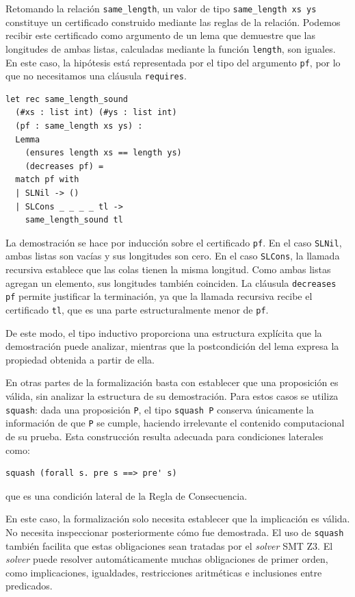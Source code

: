 \documentclass[a4paper,	11pt]{report}
\begin{document}
Retomando la relación \lstinline|same_length|,
un valor de tipo \lstinline|same_length xs ys| constituye un certificado construido mediante las reglas de la relación.
Podemos recibir este certificado como argumento de un lema que demuestre que las longitudes de ambas listas,
calculadas mediante la función \lstinline|length|,
son iguales.
En este caso,
la hipótesis está representada por el tipo del argumento \lstinline|pf|,
por lo que no necesitamos una cláusula \lstinline|requires|.
\begin{lstlisting}
let rec same_length_sound
  (#xs : list int) (#ys : list int)
  (pf : same_length xs ys) :
  Lemma
    (ensures length xs == length ys)
    (decreases pf) =
  match pf with
  | SLNil -> ()
  | SLCons _ _ _ _ tl ->
    same_length_sound tl
\end{lstlisting}

La demostración se hace por inducción sobre el certificado \lstinline|pf|.
En el caso \lstinline|SLNil|,
ambas listas son vacías y sus longitudes son cero.
En el caso \lstinline|SLCons|,
la llamada recursiva establece que las colas tienen la misma longitud.
Como ambas listas agregan un elemento,
sus longitudes también coinciden.
La cláusula \lstinline|decreases pf| permite justificar la terminación,
ya que la llamada recursiva recibe el certificado \lstinline|tl|,
que es una parte estructuralmente menor de \lstinline|pf|.

De este modo,
el tipo inductivo proporciona una estructura explícita que la demostración puede analizar,
mientras que la postcondición del lema expresa la propiedad obtenida a partir de ella.

En otras partes de la formalización basta con establecer que una proposición es válida,
sin analizar la estructura de su demostración.
Para estos casos se utiliza \lstinline|squash|:
dada una proposición \lstinline|P|,
el tipo \lstinline|squash P| conserva únicamente la información de que \lstinline|P| se cumple,
haciendo irrelevante el contenido computacional de su prueba.
Esta construcción resulta adecuada para condiciones laterales como:
\begin{lstlisting}
squash (forall s. pre s ==> pre' s)
\end{lstlisting}
que es una condición lateral de la Regla de Consecuencia.

En este caso, la formalización solo necesita establecer que la implicación es válida.
No necesita inspeccionar posteriormente cómo fue demostrada.
El uso de \lstinline|squash| también facilita que estas obligaciones sean tratadas por el \emph{solver} SMT Z3.
El \emph{solver} puede resolver automáticamente muchas obligaciones de primer orden,
como implicaciones, igualdades, restricciones aritméticas e inclusiones entre predicados.
\end{document}

